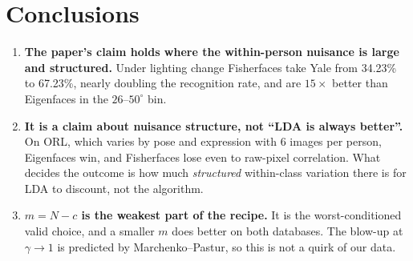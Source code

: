 \documentclass[11pt]{article}
\begin{document}
\section{Conclusions}
\begin{enumerate}
\item \textbf{The paper's claim holds where the within-person nuisance is large and structured.} Under lighting change Fisherfaces take Yale from 34.23\% to 67.23\%, nearly doubling the recognition rate, and are $15\times$ better than Eigenfaces in the $26$--$50^\circ$ bin.
\item \textbf{It is a claim about nuisance structure, not ``LDA is always better''.} On ORL, which varies by pose and expression with 6 images per person, Eigenfaces win, and Fisherfaces lose even to raw-pixel correlation. What decides the outcome is how much \emph{structured} within-class variation there is for LDA to discount, not the algorithm.
\item \textbf{$m=N-c$ is the weakest part of the recipe.} It is the worst-conditioned valid choice, and a smaller $m$ does better on both databases. The blow-up at $\gamma\to1$ is predicted by Marchenko--Pastur, so this is not a quirk of our data.
\end{enumerate}
\end{document}
